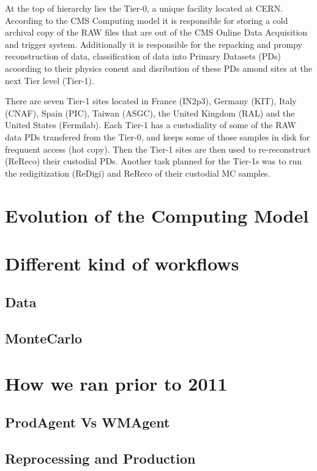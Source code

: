 \documentclass[journal, transmag]{IEEEtran}
\begin{document}
At the top of hierarchy lies the Tier-0, a unique facility located at CERN. According to the CMS Computing model it is responsible for storing a cold archival copy of the RAW files that are out of the CMS Online Data Acquisition and trigger system. Additionally it is responsible for the repacking and prompy reconstruction of data, classification of data into Primary Datasets (PDs) acoording to their physics conent and disribution of these PDs amond sites at the next Tier level (Tier-1).

There are seven Tier-1 sites located in France (IN2p3), Germany (KIT), Italy (CNAF), Spain (PIC), Taiwan (ASGC), the United Kingdom (RAL) and the United States (Fermilab). Each Tier-1 has a custodiality of some of the RAW data PDs transfered from the Tier-0, and keeps some of those samples in disk for frequuent access (hot copy). Then the Tier-1 sites are then used to re-reconstruct (ReReco) their custodial PDs. Another task planned for the Tier-1s was to run the redigitization (ReDigi) and ReReco of their custodial MC samples. 



\section{Evolution of the Computing Model}


\section{Different kind of workflows}

\subsection{Data}
\subsection{MonteCarlo}

\section{How we ran prior to 2011}
\subsection{ProdAgent Vs WMAgent}
\subsection{Reprocessing and Production}
\end{document}
